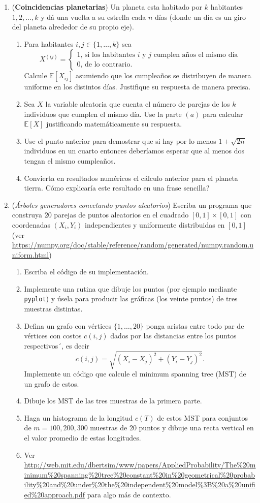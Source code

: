 \documentclass[12pt, a4paper]{article}
\newcommand{\EE}{\mathbb{E}}
\begin{document}
\begin{enumerate}
\item ({\bf Coincidencias planetarias}) Un planeta esta habitado por $k$ habitantes $1,2,\dots, k$ y dá una vuelta a su estrella cada $n$ días (donde un día es un giro del planeta alrededor de su propio eje).
\begin{enumerate}
\item Para habitantes $i,j\in \{1,\dots, k\}$ sea 
\[X^{(ij)}=\begin{cases}
1\text{, si los habitantes $i$ y $j$ cumplen años el mismo día}\\
0\text{, de lo contrario.}
\end{cases}
\]
Calcule $\EE[X_{ij}]$ asumiendo que los cumpleaños se distribuyen de manera uniforme en los distintos días. Justifique su respuesta de manera precisa.
\item Sea $X$ la variable aleatoria que cuenta el número de parejas de los $k$ individuos que cumplen el mismo día. Use la parte $(a)$ para calcular $\EE[X]$ justificando matemáticamente su respuesta.
\item Use el punto anterior para demostrar que si hay por lo menos $1+\sqrt{2n}$ individuos en un cuarto entonces deberíamos esperar que al menos dos tengan el mismo cumpleaños.
\item Convierta en resultados numéricos el cálculo anterior para el planeta tierra. Cómo explicaría este resultado en una frase sencilla?
\end{enumerate}

\item ({\it Árboles generadores conectando puntos aleatorios})  Escriba un programa que construya $20$ parejas de puntos aleatorios en el cuadrado $[0,1]\times [0,1]$
con coordenadas $(X_i,Y_i)$ independientes y uniformente distribuidas en $[0,1]$ (ver \url{https://numpy.org/doc/stable/reference/random/generated/numpy.random.uniform.html})
\begin{enumerate}
\item Escriba el código de su implementación.
\item Implemente una rutina que dibuje los puntos (por ejemplo mediante \verb!pyplot!) y úsela para producir las gráficas (los veinte puntos) de tres muestras distintas.
\item Defina un grafo con vértices $\{1,\dots, 20\}$ ponga aristas entre todo par de vértices con costos $c(i,j)$ dados por las distancias entre los puntos respectivos´, es decir
\[c(i,j)=\sqrt{(X_i-X_j)^2+(Y_i-Y_j)^2}.\] Implemente un código que calcule el minimum spanning tree (MST) de un grafo de estos.
\item Dibuje los MST de las tres muestras de la primera parte.
\item Haga un histograma de la longitud $c(T)$ de estos MST para conjuntos de $m=100,200,300$ muestras de $20$ puntos y dibuje una recta vertical en el valor promedio de estas longitudes. 
\item Ver \url{http://web.mit.edu/dbertsim/www/papers/AppliedProbability/The%20minimum%20spanning%20tree%20constant%20in%20geometrical%20probability%20and%20under%20the%20independent%20model%3B%20a%20unified%20approach.pdf}
para algo más de contexto.
\end{enumerate}
\end{enumerate}
\end{document}
